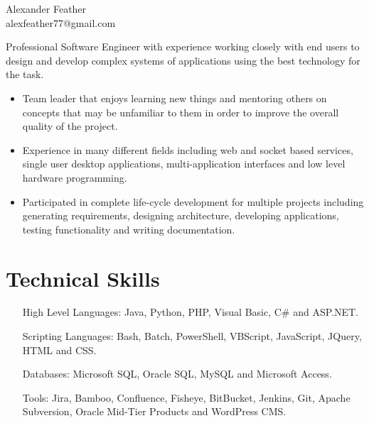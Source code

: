 \documentclass[12pt, letterpaper]{article}
\begin{document}
\pagestyle{empty}
\selectfont
\begin{center}
{\huge Alexander Feather} \\
\vspace{0.1cm}
alexfeather77@gmail.com
\end{center}
\vspace{-0.2cm}
Professional Software Engineer with experience working closely with end users to design and develop complex systems of applications using the best technology for the task.
\begin{itemize}[itemsep=0cm, parsep=0.2cm]
    \item Team leader that enjoys learning new things and mentoring others on concepts that may be unfamiliar to them in order to improve the overall quality of the project.
    \item Experience in many different fields including web and socket based services, single user desktop applications, multi-application interfaces and low level hardware programming.
    \item Participated in complete life-cycle development for multiple projects including generating requirements, designing architecture, developing applications, testing functionality and writing documentation. 
\end{itemize}
\vspace{-0.9cm}
\section*{\selectfont Technical Skills}
\vspace{-0.2cm}
\begin{itemize}[itemsep=0cm, leftmargin=2in, align=parleft, labelwidth=1.6in]
    \item[High Level Languages:] Java, Python, PHP, Visual Basic, C\# and ASP.NET.
    \item[Scripting Languages:] Bash, Batch, PowerShell, VBScript, JavaScript, JQuery, HTML and CSS.
    \item[Databases:] Microsoft SQL, Oracle SQL, MySQL and Microsoft Access.
    \item[Tools:] Jira, Bamboo, Confluence, Fisheye, BitBucket, Jenkins, Git, Apache Subversion, Oracle Mid-Tier Products and WordPress CMS.
\end{itemize}
\vspace{-1.1cm}
\end{document}
